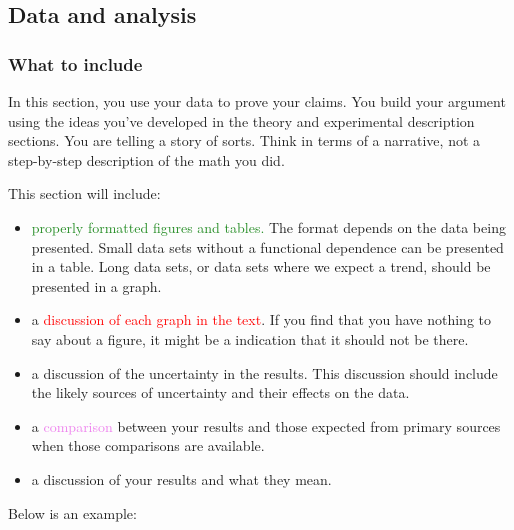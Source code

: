 \documentclass[12pt]{article}
\begin{document}
\newpage

\subsection{Data and analysis}
\label{sec:Data}

\subsubsection{What to include}

In this section, you use your data to prove your claims. You build
your argument using the ideas you've developed in the theory and
experimental description sections. You are telling a story of
sorts. Think in terms of a narrative, not a step-by-step description
of the math you did.

This section will include:

\begin{itemize}
\item \textcolor{ForestGreen}{properly formatted figures and tables.}
  The format depends on the data being presented. Small data sets
  without a functional dependence can be presented in a table. Long
  data sets, or data sets where we expect a trend, should be presented
  in a graph.
\item a \textcolor{red}{discussion of each graph in the text}. If you
  find that you have nothing to say about a figure, it might be a
  indication that it should not be there.
\item a discussion of the \textcolor{BurntOrange}{uncertainty in the
    results.} This discussion should include the likely sources of
  uncertainty and their effects on the data.
\item a \textcolor{violet}{comparison} between your results and those
  expected from primary sources when those comparisons are available.
\item \textcolor{Sepia}{a discussion of your results and what they
    mean.}
\end{itemize}

Below is an example:
\end{document}
